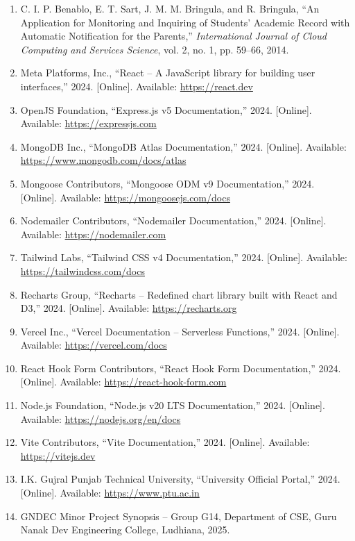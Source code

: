 \documentclass[12pt,a4paper]{report}
\begin{document}
\begin{enumerate}
  \item C. I. P. Benablo, E. T. Sart, J. M. M. Bringula, and R. Bringula, ``An Application for Monitoring and Inquiring of Students' Academic Record with Automatic Notification for the Parents,'' \textit{International Journal of Cloud Computing and Services Science}, vol. 2, no. 1, pp. 59--66, 2014.

  \item Meta Platforms, Inc., ``React -- A JavaScript library for building user interfaces,'' 2024. [Online]. Available: \url{https://react.dev}

  \item OpenJS Foundation, ``Express.js v5 Documentation,'' 2024. [Online]. Available: \url{https://expressjs.com}

  \item MongoDB Inc., ``MongoDB Atlas Documentation,'' 2024. [Online]. Available: \url{https://www.mongodb.com/docs/atlas}

  \item Mongoose Contributors, ``Mongoose ODM v9 Documentation,'' 2024. [Online]. Available: \url{https://mongoosejs.com/docs}

  \item Nodemailer Contributors, ``Nodemailer Documentation,'' 2024. [Online]. Available: \url{https://nodemailer.com}

  \item Tailwind Labs, ``Tailwind CSS v4 Documentation,'' 2024. [Online]. Available: \url{https://tailwindcss.com/docs}

  \item Recharts Group, ``Recharts -- Redefined chart library built with React and D3,'' 2024. [Online]. Available: \url{https://recharts.org}

  \item Vercel Inc., ``Vercel Documentation -- Serverless Functions,'' 2024. [Online]. Available: \url{https://vercel.com/docs}

  \item React Hook Form Contributors, ``React Hook Form Documentation,'' 2024. [Online]. Available: \url{https://react-hook-form.com}

  \item Node.js Foundation, ``Node.js v20 LTS Documentation,'' 2024. [Online]. Available: \url{https://nodejs.org/en/docs}

  \item Vite Contributors, ``Vite Documentation,'' 2024. [Online]. Available: \url{https://vitejs.dev}

  \item I.K. Gujral Punjab Technical University, ``University Official Portal,'' 2024. [Online]. Available: \url{https://www.ptu.ac.in}

  \item GNDEC Minor Project Synopsis -- Group G14, Department of CSE, Guru Nanak Dev Engineering College, Ludhiana, 2025.
\end{enumerate}
\end{document}
